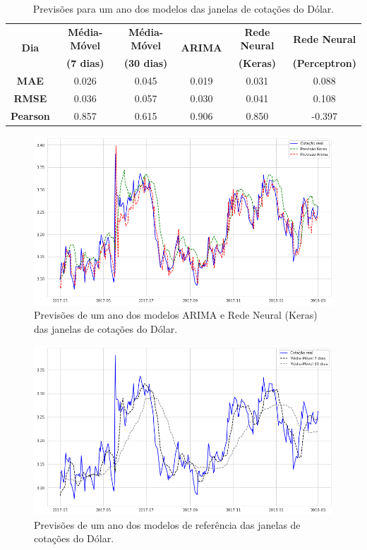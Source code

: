 \begin{table}[]
\begin{center}
\begin{tabular}{|c|c|c|c|c|c|}
\hline
\multirow{2}{*}{\textbf{Dia}} 
& \textbf{Média-Móvel} & \textbf{Média-Móvel} 
& \multirow{2}{*}{\textbf{ARIMA}}
& \textbf{Rede Neural} & \textbf{Rede Neural} \\
& \textbf{(7 dias)} & \textbf{(30 dias)}  && \textbf{(Keras)} & \textbf{(Perceptron)} \\
\hline
\hline
\textbf{MAE} & 0.026 & 0.045 & 0.019 & 0.031 & 0.088 \\
\textbf{RMSE} & 0.036 & 0.057 & 0.030 & 0.041 & 0.108 \\
\textbf{Pearson} & 0.857 & 0.615 & 0.906 & 0.850 & -0.397 \\
\hline
\end{tabular}
\caption{Previsões para um ano dos modelos das janelas de cotações do Dólar.}\label{tabela:teste_ano}
\end{center}
\end{table}


\begin{figure}[htb]
\centering
\includegraphics[width=15cm]{figuras/series_previsoes_ano_1}
\caption{Previsões de um ano dos modelos ARIMA e Rede Neural (Keras) das janelas de cotações do Dólar.}
\label{fig:previsoes_ano_1}
\end{figure}

\begin{figure}[htb]
\centering
\includegraphics[width=15cm]{figuras/series_previsoes_ano_2}
\caption{Previsões de um ano dos modelos de referência das janelas de cotações do Dólar.}
\label{fig:previsoes_ano_2}
\end{figure}